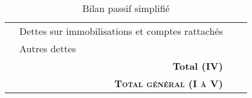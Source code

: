 \begin{table}[h]
\begin{tabular}{|l|p{6cm}|c|c|}
\cline{2-4}                                                                                                                                                  
                                                                                              & Dettes sur immobilisations et comptes rattachés		                                              &     &   \\ 
\cline{2-4}                                                                                                                                                  
                                                                                              & Autres dettes                      &     &   \\ 
\cline{2-4}                                                                                                                                                 
                                                                                              & \multicolumn{1}{r|}{\textbf{Total (IV)}}              &     &   \\                                                                                   
\hline                                                                                                                                                                      
 \multicolumn{2}{|r|}{\textbf{\textsc{Total général (I à V)}}}  &  & \\
\hline                                                                                                                                                                                                                                                                                                       
\end{tabular}
\label{bilanPassif}
\caption{Bilan passif simplifié}
\end{table}